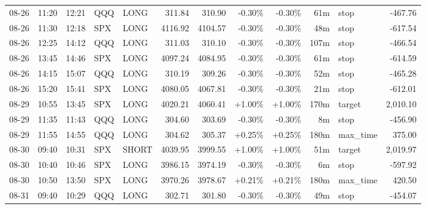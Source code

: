 \documentclass[11pt,a4paper,twoside]{article}
\begin{document}
\begin{center}
\begin{longtable}{>{\color{txtmain}}l l l l l r r r r r >{\color{txtmain}}l r}
08-26 & 11:20 & 12:21 & QQQ & LONG & 311.84 & 310.90 & \textcolor{lossred}{-0.30\%} & \textcolor{lossred}{-0.30\%} & 61m & stop & \textcolor{lossred}{-467.76} \\
08-26 & 11:30 & 12:18 & SPX & LONG & 4116.92 & 4104.57 & \textcolor{lossred}{-0.30\%} & \textcolor{lossred}{-0.30\%} & 48m & stop & \textcolor{lossred}{-617.54} \\
08-26 & 12:25 & 14:12 & QQQ & LONG & 311.03 & 310.10 & \textcolor{lossred}{-0.30\%} & \textcolor{lossred}{-0.30\%} & 107m & stop & \textcolor{lossred}{-466.54} \\
08-26 & 13:45 & 14:46 & SPX & LONG & 4097.24 & 4084.95 & \textcolor{lossred}{-0.30\%} & \textcolor{lossred}{-0.30\%} & 61m & stop & \textcolor{lossred}{-614.59} \\
08-26 & 14:15 & 15:07 & QQQ & LONG & 310.19 & 309.26 & \textcolor{lossred}{-0.30\%} & \textcolor{lossred}{-0.30\%} & 52m & stop & \textcolor{lossred}{-465.28} \\
08-26 & 15:20 & 15:41 & SPX & LONG & 4080.05 & 4067.81 & \textcolor{lossred}{-0.30\%} & \textcolor{lossred}{-0.30\%} & 21m & stop & \textcolor{lossred}{-612.01} \\
08-29 & 10:55 & 13:45 & SPX & LONG & 4020.21 & 4060.41 & \textcolor{wingreen}{+1.00\%} & \textcolor{wingreen}{+1.00\%} & 170m & target & \textcolor{wingreen}{2,010.10} \\
08-29 & 11:35 & 11:43 & QQQ & LONG & 304.60 & 303.69 & \textcolor{lossred}{-0.30\%} & \textcolor{lossred}{-0.30\%} & 8m & stop & \textcolor{lossred}{-456.90} \\
08-29 & 11:55 & 14:55 & QQQ & LONG & 304.62 & 305.37 & \textcolor{wingreen}{+0.25\%} & \textcolor{wingreen}{+0.25\%} & 180m & max\_time & \textcolor{wingreen}{375.00} \\
08-30 & 09:40 & 10:31 & SPX & SHORT & 4039.95 & 3999.55 & \textcolor{wingreen}{+1.00\%} & \textcolor{wingreen}{+1.00\%} & 51m & target & \textcolor{wingreen}{2,019.97} \\
08-30 & 10:40 & 10:46 & SPX & LONG & 3986.15 & 3974.19 & \textcolor{lossred}{-0.30\%} & \textcolor{lossred}{-0.30\%} & 6m & stop & \textcolor{lossred}{-597.92} \\
08-30 & 10:50 & 13:50 & SPX & LONG & 3970.26 & 3978.67 & \textcolor{wingreen}{+0.21\%} & \textcolor{wingreen}{+0.21\%} & 180m & max\_time & \textcolor{wingreen}{420.50} \\
08-31 & 09:40 & 10:29 & QQQ & LONG & 302.71 & 301.80 & \textcolor{lossred}{-0.30\%} & \textcolor{lossred}{-0.30\%} & 49m & stop & \textcolor{lossred}{-454.07} \\

\end{longtable}
\end{center}
\end{document}
